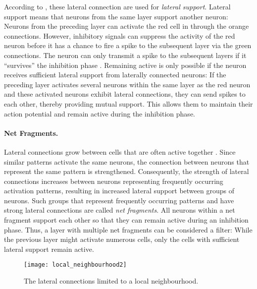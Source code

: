 According to , these lateral connection are used for \emph{lateral support}. Lateral support means that neurons from the same layer support another neuron:
Neurons from the preceding layer can activate the red cell in  through the orange connections.
However, inhibitory signals can suppress the activity of the red neuron before it has a chance to fire a spike to the subsequent layer via the green connections. The neuron can only transmit a spike to the subsequent layers if it ``survives'' the inhibition phase \cite{coombs_specific_1955}. Remaining active is only possible if the neuron receives sufficient lateral support from laterally connected neurons:
If the preceding layer activates several neurons within the same layer as the red neuron and these activated neurons exhibit lateral connections, they can send spikes to each other, thereby providing mutual support. This allows them to maintain their action potential and remain active during the inhibition phase.

\paragraph{Net Fragments.} Lateral connections grow between cells that are often active together .
Since similar patterns activate the same neurons, the connection between neurons that represent the same pattern is strengthened. 
Consequently, the strength of lateral connections increases between neurons representing frequently occurring activation patterns, resulting in increased lateral support between groups of neurons. Such groups that represent frequently occurring patterns and have strong lateral connections are called \emph{net fragments}.
All neurons within a net fragment support each other so that they can remain active during an inhibition phase. 
Thus, a layer with multiple net fragments can be considered a filter: While the previous layer might activate numerous cells, only the cells with sufficient lateral support remain active.

\begin{figure}[h]
    \centering
    \texttt{[image: local\_neighbourhood2]}
    \caption[Lateral connections limited to a local neighbourhood]{The lateral connections limited to a local neighbourhood.}
\end{figure}
